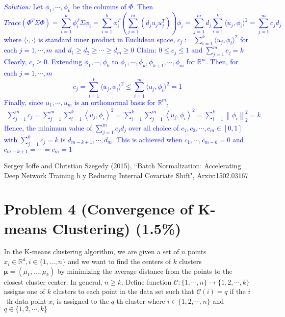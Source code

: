 \documentclass{article}
\def\solColor{blue}
\begin{document}
\textcolor{\solColor}{\textit{Solution:}
Let $\phi_1, \cdots, \phi_k$ be the columns of $\Phi$. Then
$$
Trace(\Phi^T\Sigma\Phi) = \sum_{i=1}^k \phi_i^T\Sigma \phi_i = \sum_{i=1}^k \phi_i^T(\sum_{j=1}^m (d_ju_ju_j^T) )\phi_i = \sum_{j=1}^m d_j\sum_{i=1}^k\langle u_j, \phi_i\rangle^2 = \sum_{j=1}^m c_jd_j
$$
where $\langle\cdot, \cdot\rangle$ is standard inner product in Euclidean space, $c_j:= \sum_{i=1}^k\langle u_j, \phi_i\rangle^2$ for each $j=1, \cdots, m$ and $d_1\geq d_2\geq \cdots\geq d_m\geq 0$
Claim: $0\leq c_j\leq 1$ and $\sum_{j=1}^m c_j = k$
Clearly, $c_j\geq 0$. Extending $\phi_1, \cdots, \phi_k$ to $\phi_1, \cdots, \phi_k, \phi_{k+1}, \cdots, \phi_m$ for $\mathbb{R}^m$. Then, for each $j=1, \cdots, m$
$$
c_j = \sum_{i=1}^k \langle u_j, \phi_i\rangle^2 \leq \sum_{i=1}^m \langle u_j, \phi_i\rangle^2 = 1
$$
Finally, since $u_1, \cdots, u_m$ is an orthonormal basis for $\mathbb{R}^m$,
\begin{align*}
    \sum_{j=1}^{m} c_{j}=\sum_{j=1}^{m} \sum_{i=1}^{k}\left\langle{u}_{j}, {\phi}_{i}\right\rangle^{2}=\sum_{i=1}^{k} \sum_{j=1}^{m}\left\langle{u}_{j}, {\phi}_{i}\right\rangle^{2}=\sum_{i=1}^{k}\left\|{\phi}_{i}\right\|_{2}^{2}=k
\end{align*}
Hence, the minimum value of $\sum_{j=1}^m c_jd_j$ over all choice of $c_1, c_2, \cdots, c_m\in[0,1]$ with $\sum_{j=1}^k c_j=k$ is $d_{m-k+1}, \cdots, d_{m}$. This is achieved when $c_1, \cdots, c_{m-k} = 0$ and $c_{m-k+1} = \cdots = c_m = 1$
}
\begin{thebibliography}{50}
	 Sergey Ioffe and Christian Szegedy (2015), ``Batch Normalization: Accelerating Deep Network Training b
y Reducing Internal Covariate Shift", Arxiv:1502.03167
\end{thebibliography}
\newpage
\section*{Problem 4 (Convergence of K-means Clustering)
(1.5\%)}
 In the K-means clustering algorithm, we are given a set of $n$ points $x_i \in \mathbb{R}^d, i \in\{1, \ldots, n\}$ and we want to find the centers of $k$ clusters $\boldsymbol{\mu}=\left(\mu_1, \ldots, \mu_k\right)$ by minimizing the average distance from the points to the closest cluster center. In general, $n\geq k$. Define function $\mathcal{C} :\{1, \cdots, n\}\rightarrow \{1, 2,\cdots, k\}$ assigns one of $k$ clusters to each point in the data set such that $\mathcal{C}(i) = q$ if the $i$-th data point $x_i$ is assigned to the $q$-th cluster where $i\in\{1, 2, \cdots, n\}$ and $q\in\{1, 2, \cdots, k\}$
\end{document}
